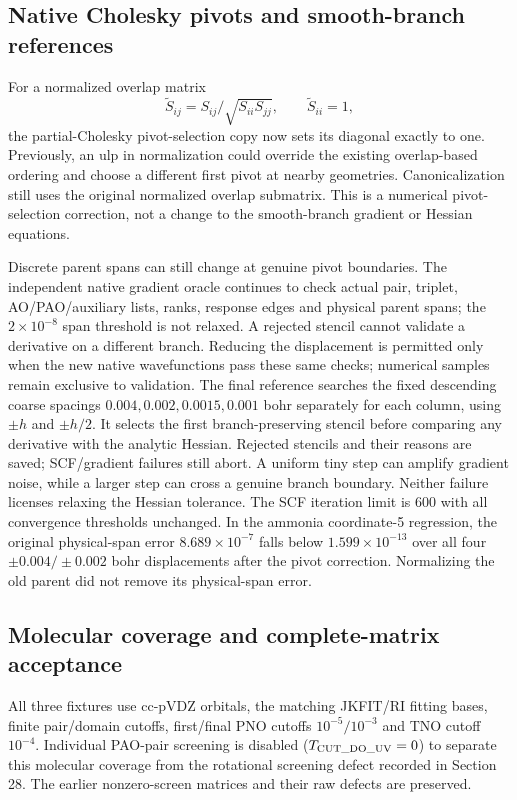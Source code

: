 \documentclass[11pt]{article}
\begin{document}
\subsection{Native Cholesky pivots and smooth-branch references}
For a normalized overlap matrix
\begin{equation}
 \widetilde S_{ij}=S_{ij}/\sqrt{S_{ii}S_{jj}},\qquad
 \widetilde S_{ii}=1,
\end{equation}
the partial-Cholesky pivot-selection copy now sets its diagonal exactly
to one. Previously, an ulp in normalization could override the existing
overlap-based ordering and choose a different first pivot at nearby
geometries. Canonicalization still uses the original normalized overlap
submatrix. This is a numerical pivot-selection correction, not a change
to the smooth-branch gradient or Hessian equations.

Discrete parent spans can still change at genuine pivot boundaries.
The independent native gradient oracle continues to check actual pair,
triplet, AO/PAO/auxiliary lists, ranks, response edges and physical parent
spans; the $2\times10^{-8}$ span threshold is not relaxed. A rejected
stencil cannot validate a derivative on a different branch. Reducing
the displacement is permitted only when the new native wavefunctions
pass these same checks; numerical samples remain exclusive to validation.
The final reference searches the fixed descending coarse spacings
$0.004,0.002,0.0015,0.001$ bohr separately for each column, using
$\pm h$ and $\pm h/2$. It selects the first branch-preserving stencil
before comparing any derivative with the analytic Hessian. Rejected
stencils and their reasons are saved; SCF/gradient failures still abort.
A uniform tiny step can amplify gradient noise, while a larger step
can cross a genuine branch boundary. Neither failure licenses relaxing
the Hessian tolerance. The SCF iteration limit is 600 with all
convergence thresholds unchanged.
In the ammonia coordinate-5 regression, the original physical-span error
$8.689\times10^{-7}$ falls below $1.599\times10^{-13}$ over all four
$\pm0.004/\pm0.002$ bohr displacements after the pivot correction.
Normalizing the old parent did not remove its physical-span error.

\subsection{Molecular coverage and complete-matrix acceptance}
All three fixtures use cc-pVDZ orbitals, the matching JKFIT/RI fitting
bases, finite pair/domain cutoffs, first/final PNO cutoffs
$10^{-5}/10^{-3}$ and TNO cutoff $10^{-4}$. Individual PAO-pair screening
is disabled ($T_{\rm CUT\_DO\_UV}=0$) to separate this molecular coverage
from the rotational screening defect recorded in Section 28. The earlier
nonzero-screen matrices and their raw defects are preserved.
\end{document}
